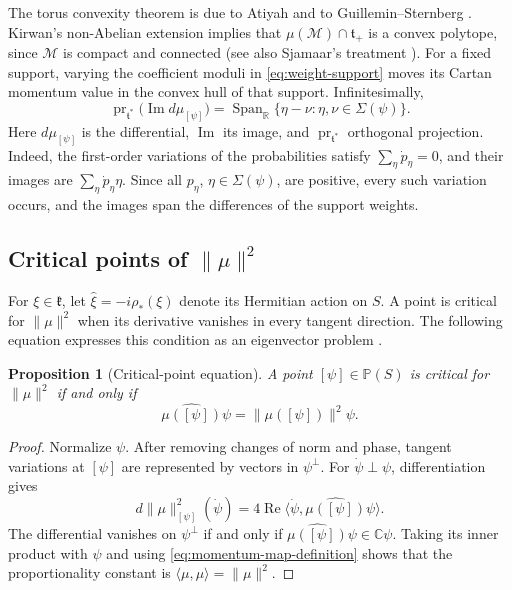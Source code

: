 \documentclass{article}
\newtheorem{proposition}[theorem]{Proposition}
\theoremstyle{definition}
\theoremstyle{remark}
\newcommand{\C}{\mathbb C}
\newcommand{\R}{\mathbb R}
\newcommand{\PP}{\mathbb P}
\newcommand{\Span}{\operatorname{Span}}
\newcommand{\norm}[1]{\lVert #1\rVert}
\begin{document}
The torus convexity theorem is due to Atiyah
\cite{Atiyah1982ConvexityAC} and to Guillemin--Sternberg
\cite{GuilleminSternberg1982}. Kirwan's non-Abelian extension
\cite{Kirwan1984ConvexityIII} implies that
$\mu(\mathcal M)\cap\mathfrak t_+$ is a convex polytope, since $\mathcal M$ is compact and connected (see also Sjamaar's treatment \cite{Sjamaar1998Convexity}). For a fixed support,
varying the coefficient moduli in \eqref{eq:weight-support} moves its Cartan
momentum value in the convex hull of that support.  Infinitesimally,
\begin{equation}
 \operatorname{pr}_{\mathfrak t^*}
 \bigl(\operatorname{Im}d\mu_{[\psi]}\bigr)
 =\Span_{\R}\{\eta-\nu:\eta,\nu\in\Sigma(\psi)\}.
\end{equation}
Here $d\mu_{[\psi]}$ is the differential, $\operatorname{Im}$ its image,
and $\operatorname{pr}_{\mathfrak t^*}$ orthogonal projection.
Indeed, the first-order variations of the probabilities satisfy
$\sum_\eta\dot p_\eta=0$, and their images are
$\sum_\eta\dot p_\eta\eta$. Since all $p_\eta$, $\eta\in\Sigma(\psi)$, are positive, every such variation occurs, and the images span the differences of the support weights.

\subsection{Critical points of \texorpdfstring{$\norm\mu^2$}{the squared momentum norm}}
\label{sec:critical-machinery}

For $\xi\in\mathfrak k$, let
$\widehat\xi=-i\rho_*(\xi)$ denote its Hermitian action on $S$.
A point is critical for $\norm\mu^2$ when its derivative vanishes in
every tangent direction. The following equation expresses this condition
as an eigenvector problem
\cite{Ness1984,Kirwan_cohomology_84, SOK_criticalset,SOK_convexity}.

\begin{proposition}[Critical-point equation]
\label{prop:critical-general}
A point $[\psi]\in\PP(S)$ is critical for $\norm\mu^2$ if and only if
\begin{equation}
 \widehat{\mu([\psi])}\psi
 =\norm{\mu([\psi])}^2\psi .
 \label{eq:critical-general}
\end{equation}
\end{proposition}

\begin{proof}
Normalize $\psi$. After removing changes of norm and phase, tangent
variations at $[\psi]$ are represented by vectors in $\psi^\perp$.  For $\dot\psi\perp\psi$, differentiation gives
\begin{equation*}
 d\norm\mu^2_{[\psi]}(\dot\psi)
 =4\operatorname{Re}
   \langle\dot\psi,\widehat{\mu([\psi])}\psi\rangle.
\end{equation*}
The differential vanishes on $\psi^\perp$ if and only if
$\widehat{\mu([\psi])}\psi\in\C\psi$. Taking its inner
product with $\psi$ and using
\eqref{eq:momentum-map-definition} shows that the proportionality constant is
$\langle\mu,\mu\rangle=\norm\mu^2$.
\end{proof}
\end{document}
